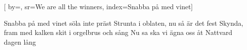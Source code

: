 

[ 		%
	by={},					%
	sr={We are all the winners},					%
	index={Snabba på med vinet}]						%
	

\beginverse*						%
Snabba på med vinet
söla inte präst
Strunta i oblaten, nu så är det fest
Skynda, fram med kalken
skit i orgelbrus och sång
Nu sa ska vi ägna oss åt Nattvard dagen lång
\endverse							%

\vspace{5mm}
\endsong							%